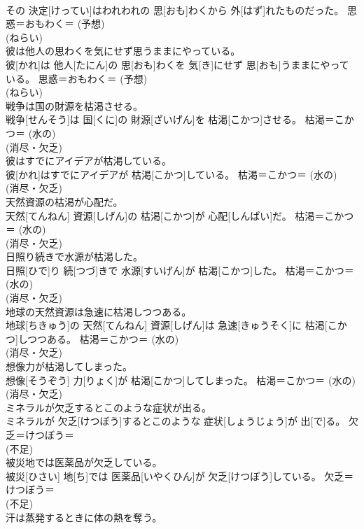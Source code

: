 \documentclass[8pt]{extreport}
\begin{document}
\begin{CJK}{UTF8}{min}
{\\	その 決定[けってい]はわれわれの 思[おも]わくから 外[はず]れたものだった。	思惑＝おもわく＝ (予想) 
\\	(ねらい) 
\\	彼は他人の思わくを気にせず思うままにやっている。	
\\	彼[かれ]は 他人[たにん]の 思[おも]わくを 気[き]にせず 思[おも]うままにやっている。	思惑＝おもわく＝ (予想) 
\\	(ねらい) 
\\	戦争は国の財源を枯渇させる。	
\\	戦争[せんそう]は 国[くに]の 財源[ざいげん]を 枯渇[こかつ]させる。	枯渇＝こかつ＝ (水の) 
\\	(消尽・欠乏) 
\\	彼はすでにアイデアが枯渇している。	
\\	彼[かれ]はすでにアイデアが 枯渇[こかつ]している。	枯渇＝こかつ＝ (水の) 
\\	(消尽・欠乏) 
\\	天然資源の枯渇が心配だ。	
\\	天然[てんねん] 資源[しげん]の 枯渇[こかつ]が 心配[しんぱい]だ。	枯渇＝こかつ＝ (水の) 
\\	(消尽・欠乏) 
\\	日照り続きで水源が枯渇した。	
\\	日照[ひで]り 続[つづ]きで 水源[すいげん]が 枯渇[こかつ]した。	枯渇＝こかつ＝ (水の) 
\\	(消尽・欠乏) 
\\	地球の天然資源は急速に枯渇しつつある。	
\\	地球[ちきゅう]の 天然[てんねん] 資源[しげん]は 急速[きゅうそく]に 枯渇[こかつ]しつつある。	枯渇＝こかつ＝ (水の) 
\\	(消尽・欠乏) 
\\	想像力が枯渇してしまった。	
\\	想像[そうぞう] 力[りょく]が 枯渇[こかつ]してしまった。	枯渇＝こかつ＝ (水の) 
\\	(消尽・欠乏) 
\\	ミネラルが欠乏するとこのような症状が出る。	
\\	ミネラルが 欠乏[けつぼう]するとこのような 症状[しょうじょう]が 出[で]る。	欠乏＝けつぼう＝ 
\\	(不足) 
\\	被災地では医薬品が欠乏している。	
\\	被災[ひさい] 地[ち]では 医薬品[いやくひん]が 欠乏[けつぼう]している。	欠乏＝けつぼう＝ 
\\	(不足) 
\\	汗は蒸発するときに体の熱を奪う。	
}
\end{CJK}
\end{document}
